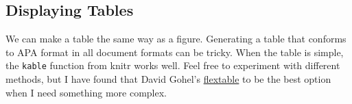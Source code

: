 \documentclass[
  jou,
  longtable,
  colorlinks=true,linkcolor=blue,citecolor=blue,urlcolor=blue]{apa7}
\newlength\Oldarrayrulewidth
\newlength\Oldtabcolsep
\begin{document}
\subsection{Displaying Tables}\label{displaying-tables}

We can make a table the same way as a figure. Generating a table that
conforms to APA format in all document formats can be tricky. When the
table is simple, the \texttt{kable} function from knitr works well. Feel
free to experiment with different methods, but I have found that David
Gohel's \href{https://davidgohel.github.io/flextable/}{flextable} to be
the best option when I need something more complex.

\end{document}
